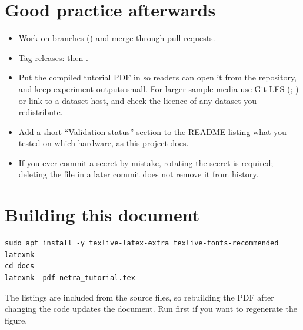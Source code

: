 \section{Good practice afterwards}
\begin{itemize}
  \item Work on branches () and merge through pull requests.
  \item Tag releases:  then .
  \item Put the compiled tutorial PDF in  so readers can open it from the repository, and keep experiment outputs small. For larger sample media use Git LFS (; ) or link to a dataset host, and check the licence of any dataset you redistribute.
  \item Add a short ``Validation status'' section to the README listing what you tested on which hardware, as this project does.
  \item If you ever commit a secret by mistake, rotating the secret is required; deleting the file in a later commit does not remove it from history.
\end{itemize}

\section{Building this document}
\begin{lstlisting}[style=sh]
sudo apt install -y texlive-latex-extra texlive-fonts-recommended latexmk
cd docs
latexmk -pdf netra_tutorial.tex
\end{lstlisting}
The listings are included from the source files, so rebuilding the PDF after changing the code updates the document. Run  first if you want to regenerate the figure.

